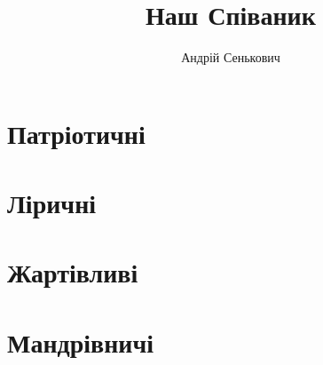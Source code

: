 \documentclass[a5paper,pagesize,openany]{scrbook}
\title{Наш Співаник}
\author{Андрій Сенькович}
\begin{document}
\maketitle
\chapter{Патріотичні}



\chapter{Ліричні}
\chapter{Жартівливі}

\chapter{Мандрівничі}
\tableofcontents
\end{document}
